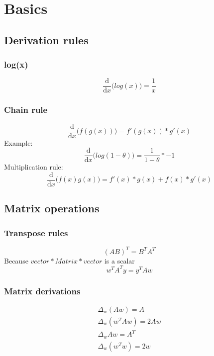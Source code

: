 \section{Basics}
\subsection{Derivation rules}
\subsubsection{log(x)}
\begin{equation}
	\frac{\mathrm{d}}{\mathrm{d} x}\big( log(x) \big) = \frac{1}{x}
\end{equation}
\subsubsection{Chain rule}
\begin{equation}
	\frac{\mathrm{d}}{\mathrm{d} x}\big( f(g(x)) \big) = f'(g(x))*g'(x)
\end{equation}
Example:
\begin{equation}
	\frac{\mathrm{d}}{\mathrm{d} x}\big( log(1-\theta) \big) = \frac{1}{1-\theta}*-
	1
\end{equation}
Multiplication rule:
\begin{equation}
	\frac{\mathrm{d}}{\mathrm{d} x}\big( f(x)g(x) \big) = f'(x)*g(x) + f(x)*g'(x)
\end{equation}
\subsection{Matrix operations}
\subsubsection{Transpose rules}
\begin{equation}
	(AB)^{T}= B^{T}A^{T}
\end{equation}
Because $vector * Matrix * vector$ is a scalar
\begin{equation}
	w^{T}A^{T}y = y^{T}Aw
\end{equation}
\subsubsection{Matrix derivations}
\begin{equation}
	\begin{aligned}
		\Delta_w(Aw) = A\\ \Delta_w(w^TAw) = 2Aw\\ \Delta_wAw = A^T\\ \Delta_w(w^Tw)
		= 2w\\
	\end{aligned}
\end{equation}